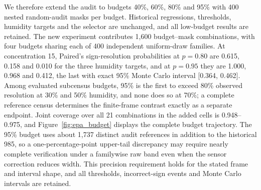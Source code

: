 We therefore extend the audit to budgets 40\%, 60\%, 80\% and 95\% with 400 nested random-audit masks per budget. Historical regressions, thresholds, humidity targets and the selector are unchanged, and all low-budget results are retained. The new experiment contributes 1,600 budget--mask combinations, with four budgets sharing each of 400 independent uniform-draw families. At concentration 15, Paired's sign-resolution probabilities at $p=0.80$ are 0.615, 0.158 and 0.010 for the three humidity targets, and at $p=0.95$ they are 1.000, 0.968 and 0.412, the last with exact 95\% Monte Carlo interval [0.364, 0.462]. Among evaluated subcensus budgets, 95\% is the first to exceed 80\% observed resolution at 30\% and 50\% humidity, and none does so at 70\%; a complete reference census determines the finite-frame contrast exactly as a separate endpoint. Joint coverage over all 21 combinations in the added cells is 0.948--0.975, and Figure~\ref{fig:epa_budget} displays the complete budget trajectory. The 95\% budget uses about 1,737 distinct audit references in addition to the historical 985, so a one-percentage-point upper-tail discrepancy may require nearly complete verification under a familywise raw band even when the sensor correction reduces width. This precision requirement holds for the stated frame and interval shape, and all thresholds, incorrect-sign events and Monte Carlo intervals are retained.





